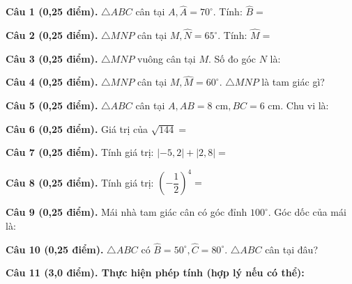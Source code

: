 \documentclass[12pt,a4paper]{article}
\begin{document}
\vspace{1.2mm}
\noindent\textbf{Câu 1 (0,25 điểm).} $\triangle ABC$ cân tại $A, \widehat{A} = 70^\circ$. Tính: $\widehat{B} =$ \par\vspace{2.5mm}
\noindent\textbf{Câu 2 (0,25 điểm).} $\triangle MNP$ cân tại $M, \widehat{N} = 65^\circ$. Tính: $\widehat{M} =$ \par\vspace{2.5mm}
\noindent\textbf{Câu 3 (0,25 điểm).} $\triangle MNP$ vuông cân tại $M$. Số đo góc $N$ là: \par\vspace{2.5mm}
\noindent\textbf{Câu 4 (0,25 điểm).} $\triangle MNP$ cân tại $M, \widehat{M} = 60^\circ$. $\triangle MNP$ là tam giác gì? \par\vspace{2.5mm}
\noindent\textbf{Câu 5 (0,25 điểm).} $\triangle ABC$ cân tại $A, AB = 8\text{ cm}, BC = 6\text{ cm}$. Chu vi là: \par\vspace{2.5mm}
\noindent\textbf{Câu 6 (0,25 điểm).} Giá trị của $\sqrt{144} =$ \par\vspace{2.5mm}
\noindent\textbf{Câu 7 (0,25 điểm).} Tính giá trị: $|-5{,}2| + |2{,}8| =$ \par\vspace{2.5mm}
\noindent\textbf{Câu 8 (0,25 điểm).} Tính giá trị: $\left(-\dfrac{1}{2}\right)^4 =$ \par\vspace{2.5mm}
\noindent\textbf{Câu 9 (0,25 điểm).} Mái nhà tam giác cân có góc đỉnh $100^\circ$. Góc dốc của mái là: \par\vspace{2.5mm}
\noindent\textbf{Câu 10 (0,25 điểm).} $\triangle ABC$ có $\widehat{B} = 50^\circ, \widehat{C} = 80^\circ$. $\triangle ABC$ cân tại đâu? \par\vspace{2.5mm}
\vspace{0.2mm}
\noindent\textbf{Câu 11 (3,0 điểm). Thực hiện phép tính (hợp lý nếu có thể):}
\vspace{0.5mm}
\end{document}
